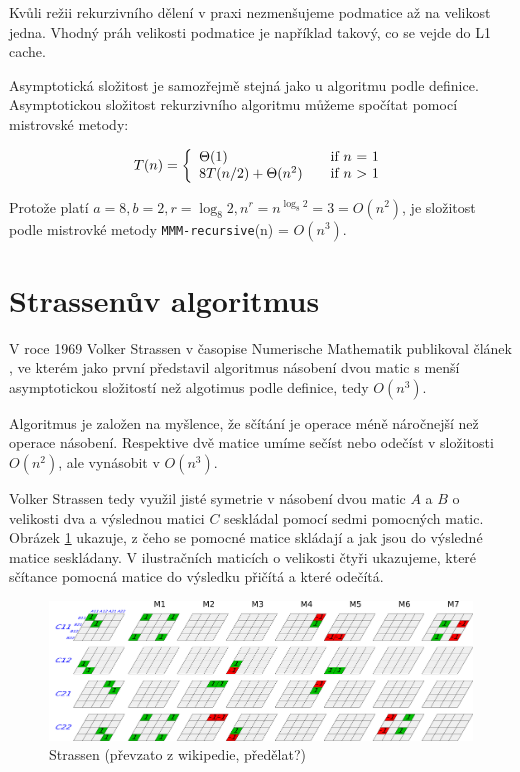 \documentclass[thesis=B,czech]{FITthesis}[2012/06/26]
\begin{document}
Kvůli režii rekurzivního dělení v praxi nezmenšujeme podmatice až na velikost jedna. Vhodný práh velikosti podmatice je například takový, co se vejde do L1 cache.

Asymptotická složitost je samozřejmě stejná jako u algoritmu podle definice. Asymptotickou složitost rekurzivního algoritmu můžeme spočítat pomocí mistrovské metody:

\[ T(n) = \left\{ 
  \begin{array}{l l}
    \Theta(1) & \quad \text{if $n$ = 1}\\
    8T(n/2) + \Theta(n^2) & \quad \text{if $n$ > 1}
  \end{array} \right.\]

Protože platí $a=8, b=2, r=\log_{8} 2, n^r=n^{\log_{8} 2}=3=O(n^2)$, je složitost podle mistrovké metody \texttt{MMM-recursive}(n) = $O(n^3)$.

\section{Strassenův algoritmus}

V roce 1969 Volker Strassen v časopise Numerische Mathematik publikoval článek \cite{GEMnO}, ve kterém jako první představil algoritmus násobení dvou matic s menší asymptotickou složitostí než algotimus podle definice, tedy $O(n^3)$.

Algoritmus je založen na myšlence, že sčítání je operace méně náročnejší než operace násobení. Respektive dvě matice umíme sečíst nebo odečíst v složitosti $O(n^2)$, ale vynásobit v $O(n^3)$.

Volker Strassen tedy využil jisté symetrie \cite{StrNat} v násobení dvou matic $A$ a $B$ o velikosti dva a výslednou matici $C$ seskládal pomocí sedmi pomocných matic. Obrázek \ref{fig:StrVis} ukazuje, z čeho se pomocné matice skládají a jak jsou do výsledné matice seskládany. V ilustračních maticích o velikosti čtyři ukazujeme, které sčítance pomocná matice do výsledku přičítá a které odečítá. 

\begin{figure}[H]\centering
	\includegraphics[width=\textwidth]{./images/strassen}
	\caption{Strassen (převzato z wikipedie, předělat?)}
	\label{fig:StrVis}
\end{figure}
\end{document}
